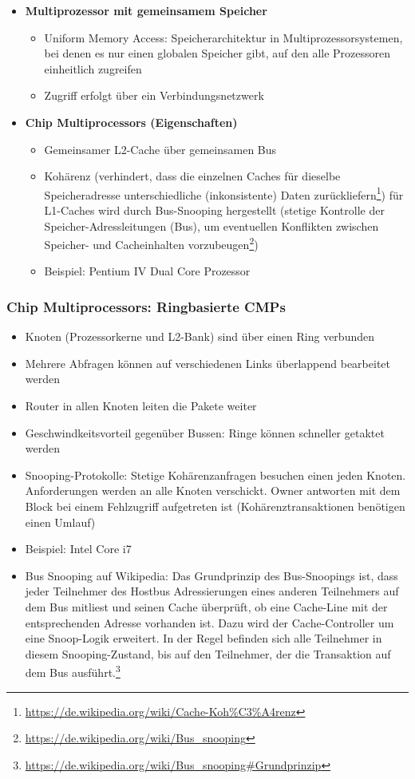 \begin{itemize}
\begin{itemize}
	\end{itemize}
	\item \textbf{Multiprozessor mit gemeinsamem Speicher}
	\begin{itemize}
		\item Uniform Memory Access: Speicherarchitektur in Multiprozessorsystemen, bei denen es nur einen globalen Speicher gibt, auf den alle Prozessoren einheitlich zugreifen
		\item Zugriff erfolgt über ein Verbindungsnetzwerk
	\end{itemize}
	\item \textbf{Chip Multiprocessors (Eigenschaften)}
	\begin{itemize}
		\item Gemeinsamer L2-Cache über gemeinsamen Bus
		\item Kohärenz (verhindert, dass die einzelnen Caches für dieselbe Speicheradresse unterschiedliche (inkonsistente) Daten zurückliefern\footnote{\url{https://de.wikipedia.org/wiki/Cache-Koh\%C3\%A4renz}}) für L1-Caches wird durch Bus-Snooping hergestellt (stetige Kontrolle der Speicher-Adressleitungen (Bus), um eventuellen Konflikten zwischen Speicher- und Cacheinhalten vorzubeugen\footnote{\url{https://de.wikipedia.org/wiki/Bus_snooping}})
		\item Beispiel: Pentium IV Dual Core Prozessor
	\end{itemize}
\end{itemize}

\subsubsection{Chip Multiprocessors: Ringbasierte CMPs}
\begin{itemize}
	\item Knoten (Prozessorkerne und L2-Bank) sind über einen Ring verbunden
	\item Mehrere Abfragen können auf verschiedenen Links überlappend bearbeitet werden
	\item Router in allen Knoten leiten die Pakete weiter
	\item Geschwindkeitsvorteil gegenüber Bussen: Ringe können schneller getaktet werden
	\item Snooping-Protokolle: Stetige Kohärenzanfragen besuchen einen jeden Knoten. Anforderungen werden an alle Knoten verschickt. Owner antworten mit dem Block bei einem Fehlzugriff aufgetreten ist (Kohärenztransaktionen benötigen einen Umlauf)
	\item Beispiel: Intel Core i7
	\item Bus Snooping auf Wikipedia: Das Grundprinzip des Bus-Snoopings ist, dass jeder Teilnehmer des Hostbus Adressierungen eines anderen Teilnehmers auf dem Bus mitliest und seinen Cache überprüft, ob eine Cache-Line mit der entsprechenden Adresse vorhanden ist. Dazu wird der Cache-Controller um eine Snoop-Logik erweitert. In der Regel befinden sich alle Teilnehmer in diesem Snooping-Zustand, bis auf den Teilnehmer, der die Transaktion auf dem Bus ausführt.\footnote{\url{https://de.wikipedia.org/wiki/Bus_snooping\#Grundprinzip}}
\end{itemize}


